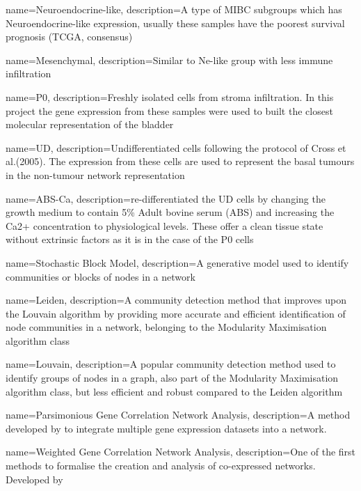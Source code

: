 {
    name=Neuroendocrine-like,
    description={A type of MIBC subgroups which has Neuroendocrine-like expression, usually these samples have the poorest survival prognosis (TCGA, consensus)}
}

{
    name=Mesenchymal,
    description={Similar to Ne-like group with less immune infiltration}
}

{
    name=P0,
    description={Freshly isolated cells from stroma infiltration. In this project the gene expression from these samples were used to built the closest molecular representation of the bladder}
}

{
    name=UD,
    description={Undifferentiated cells following the protocol of Cross et al.(2005). The expression from these cells are used to represent the basal tumours in the non-tumour network representation}
}

{
    name=ABS-Ca,
    description={re-differentiated the UD cells by changing the growth medium to contain 5\% Adult bovine serum (ABS) and increasing the Ca2+ concentration to physiological levels. These offer a clean tissue state without extrinsic factors as it is in the case of the P0 cells}
}


{
    name=Stochastic Block Model,
    description={A generative model used to identify communities or blocks of nodes in a network}
}

{
    name=Leiden,
    description={A community detection method that improves upon the Louvain algorithm by providing more accurate and efficient identification of node communities in a network, belonging to the Modularity Maximisation algorithm class}
}

{
    name=Louvain,
    description={A popular community detection method used to identify groups of nodes in a graph, also part of the Modularity Maximisation algorithm class, but less efficient and robust compared to the Leiden algorithm}
}


{
    name=Parsimonious Gene Correlation Network Analysis,
    description={A method developed by \citet{Care2019-ij} to integrate multiple gene expression datasets into a network.
    }
}

{
    name=Weighted Gene Correlation Network Analysis,
    description={One of the first methods to formalise the creation and analysis of co-expressed networks. Developed by \citet{Langfelder2008-sn}}
}


